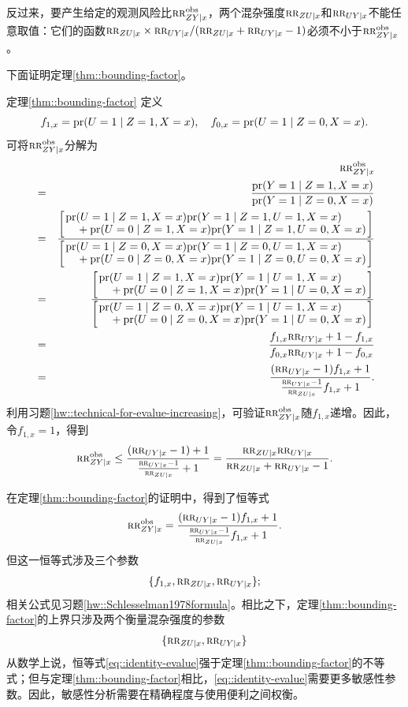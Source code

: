 反过来，要产生给定的观测风险比$\textsc{rr}_{ZY\mid x}^{\textup{obs}}$，两个混杂强度$\textsc{rr}_{ZU\mid x} $和$\textsc{rr}_{UY\mid x}$不能任意取值：它们的函数$\textsc{rr}_{ZU\mid x}  \times  \textsc{rr}_{UY\mid x} /  (\textsc{rr}_{ZU\mid x} + \textsc{rr}_{UY\mid x} - 1)$必须不小于$\textsc{rr}_{ZY\mid x}^{\textup{obs}}$。 

下面证明定理\ref{thm::bounding-factor}。 


\begin{myproof}{定理}{\ref{thm::bounding-factor}}
定义
$$ 
f_{1,x} = \textup{pr}(U=1\mid Z=1,X=x),\quad
f_{0,x}  = \textup{pr}(U=1\mid Z=0,X=x) .
$$
可将$\textsc{rr}_{ZY\mid x}^{\textup{obs}}$分解为
\begin{eqnarray*}
&&\RR_{ZY\mid x}^\obs  \\
&=& \frac{  \pr( Y  = 1\mid Z=1, X=x  ) }{ \pr( Y  = 1\mid  Z=0,  X=x  ) } \\
&=& \frac{ \left[ \splitfrac{ \pr(U=1\mid Z=1,  X=x) \pr( Y  = 1\mid Z=1, U=1,  X=x  ) }{+ \pr(U=0\mid Z=1,  X=x) \pr( Y  = 1\mid Z=1, U=0,  X=x  )} \right]}
{ \left[ \splitfrac{\pr(U=1\mid Z=0,  X=x) \pr( Y  = 1\mid  Z=0, U=1,  X=x  )}{  +  \pr(U=0\mid Z=0,  X=x) \pr( Y  = 1\mid  Z=0, U=0,  X=x  ) } \right]  } \\
&=& \frac{ \left[ \splitfrac{ \pr(U=1\mid Z=1,  X=x) \pr( Y  = 1\mid U=1,  X=x  ) }{+ \pr(U=0\mid Z=1,  X=x) \pr( Y  = 1\mid U=0,  X=x  )}\right] }
{  \left[ \splitfrac{ \pr(U=1\mid Z=0,  X=x) \pr( Y  = 1\mid   U=1,  X=x  )  }{+  \pr(U=0\mid Z=0,  X=x) \pr( Y  = 1\mid  U=0,  X=x  ) }\right]  } \\
&=& \frac{  f_{1,x} \RR_{UY\mid x} + 1- f_{1,x}  }{ f_{0,x} \RR_{UY\mid x} + 1- f_{0,x}  } \\
&=& \frac{  (\RR_{UY\mid x} - 1) f_{1,x} + 1  }{      \frac{  \RR_{UY\mid x} - 1}{  \RR_{ZU\mid x} }    f_{1,x} + 1  } .
\end{eqnarray*}
利用习题\ref{hw::technical-for-evalue-increasing}，可验证$\textsc{rr}_{ZY\mid x}^{\textup{obs}}$随$f_{1,x} $递增。因此，令$f_{1,x} = 1$，得到
$$
\textsc{rr}_{ZY\mid x}^{\textup{obs}} \leq \frac{  (\textsc{rr}_{UY\mid x} - 1) + 1  }{      \frac{  \textsc{rr}_{UY\mid x} - 1}{  \textsc{rr}_{ZU\mid x} }    + 1  }
= \frac{ \textsc{rr}_{ZU\mid x}  \textsc{rr}_{UY\mid x} }{  \textsc{rr}_{ZU\mid x} + \textsc{rr}_{UY\mid x} - 1} .
$$
\end{myproof}

在定理\ref{thm::bounding-factor}的证明中，得到了恒等式
\begin{equation}
\label{eq::identity-evalue}
\textsc{rr}_{ZY\mid x}^{\textup{obs}} = \frac{  (\textsc{rr}_{UY\mid x} - 1) f_{1,x} + 1  }{      \frac{  \textsc{rr}_{UY\mid x} - 1}{  \textsc{rr}_{ZU\mid x} }    f_{1,x} + 1  } .
\end{equation}
但这一恒等式涉及三个参数
$$
\{  f_{1,x}, \textsc{rr}_{ZU\mid x},  \textsc{rr}_{UY\mid x}  \} ;
$$
相关公式见习题\ref{hw::Schlesselman1978formula}。相比之下，定理\ref{thm::bounding-factor}的上界只涉及两个衡量混杂强度的参数
$$
\{  \textsc{rr}_{ZU\mid x},  \textsc{rr}_{UY\mid x}  \}
 $$
从数学上说，恒等式\ref{eq::identity-evalue}强于定理\ref{thm::bounding-factor}的不等式；但与定理\ref{thm::bounding-factor}相比，\ref{eq::identity-evalue}需要更多敏感性参数。因此，敏感性分析需要在精确程度与使用便利之间权衡。


